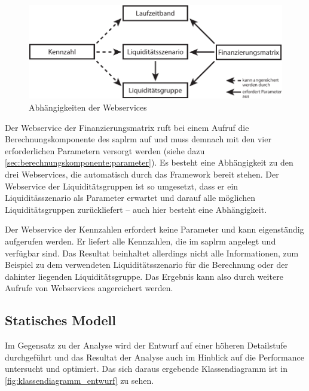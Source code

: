 \begin{onehalfspacing}
\begin{figure}[ht]
\centering
\setlength{\unitlength}{1mm}
\includegraphics[width=15cm]{images/Abbildung14-Abhaengigkeiten-Webservices.pdf}
\caption{Abhängigkeiten der Webservices\label{fig:webservice_abhaengigkeiten}}
\end{figure}


Der Webservice der Finanzierungsmatrix ruft bei einem Aufruf die Berechnungskomponente des \gls{saplrm} auf und muss demnach mit den vier erforderlichen Parametern versorgt werden (siehe dazu \vref{sec:berechnungskomponente:parameter}). Es besteht eine Abhängigkeit zu den drei Webservices, die automatisch durch das Framework bereit stehen. Der Webservice der Liquiditätsgruppen ist so umgesetzt, dass er ein Liquiditässzenario als Parameter erwartet und darauf alle möglichen Liquiditätsgruppen zurückliefert -- auch hier besteht eine Abhängigkeit.

Der Webservice der Kennzahlen erfordert keine Parameter und kann eigenständig aufgerufen werden. Er liefert alle Kennzahlen, die im \gls{saplrm} angelegt und verfügbar sind. Das Resultat beinhaltet allerdings nicht alle Informationen, zum Beispiel zu dem verwendeten Liquiditätsszenario für die Berechnung oder der dahinter liegenden Liquiditätsgruppe. Das Ergebnis kann also durch weitere Aufrufe von Webservices angereichert werden.

\subsection{Statisches Modell}
Im Gegensatz zu der Analyse wird der Entwurf auf einer höheren Detailstufe durchgeführt und das Resultat der Analyse auch im Hinblick auf die Performance untersucht und optimiert. Das sich daraus ergebende Klassendiagramm ist in \vref{fig:klassendiagramm_entwurf} zu sehen.



\end{onehalfspacing}
